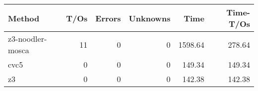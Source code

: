 \begin{tabular}{lrrrrr}
\hline
 Method           &   T/Os &   Errors &   Unknowns &    Time &   Time-T/Os \\
\hline
 z3-noodler-mosca &     11 &        0 &          0 & 1598.64 &      278.64 \\
 cvc5             &      0 &        0 &          0 &  149.34 &      149.34 \\
 z3               &      0 &        0 &          0 &  142.38 &      142.38 \\
\hline
\end{tabular}
